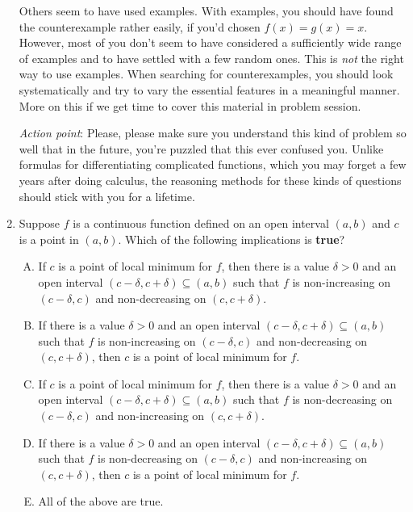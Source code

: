\documentclass[10pt]{amsart}
\begin{document}
\begin{enumerate}
  Others seem to have used examples. With examples, you should have
  found the counterexample rather easily, if you'd chosen $f(x) = g(x)
  = x$. However, most of you don't seem to have considered a
  sufficiently wide range of examples and to have settled with a few
  random ones. This is {\em not} the right way to use examples. When
  searching for counterexamples, you should look systematically and
  try to vary the essential features in a meaningful manner. More on
  this if we get time to cover this material in problem session.

  {\em Action point}: Please, please make sure you understand this
  kind of problem so well that in the future, you're puzzled that this
  ever confused you. Unlike formulas for differentiating complicated
  functions, which you may forget a few years after doing calculus,
  the reasoning methods for these kinds of questions should stick with
  you for a lifetime.

\item Suppose $f$ is a continuous function defined on an open interval
  $(a,b)$ and $c$ is a point in $(a,b)$. Which of the following
  implications is {\bf true}?
  \begin{enumerate}[(A)]

  \item If $c$ is a point of local minimum for $f$, then there is a
    value $\delta > 0$ and an open interval $(c - \delta, c + \delta)
    \subseteq (a,b)$ such that $f$ is non-increasing on $(c -
    \delta,c)$ and non-decreasing on $(c,c+\delta)$.
  \item If there is a value $\delta > 0$ and an open interval $(c -
    \delta, c + \delta) \subseteq (a,b)$ such that $f$ is
    non-increasing on $(c - \delta,c)$ and non-decreasing on
    $(c,c+\delta)$, then $c$ is a point of local minimum for $f$.
  \item If $c$ is a point of local minimum for $f$, then there is a
    value $\delta > 0$ and an open interval $(c - \delta, c + \delta)
    \subseteq (a,b)$ such that $f$ is non-decreasing on $(c -
    \delta,c)$ and non-increasing on $(c,c+\delta)$.
  \item If there is a value $\delta > 0$ and an open interval $(c -
    \delta, c + \delta) \subseteq (a,b)$ such that $f$ is
    non-decreasing on $(c - \delta,c)$ and non-increasing on
    $(c,c+\delta)$, then $c$ is a point of local minimum for $f$.
  \item All of the above are true.
  \end{enumerate}


\end{enumerate}
\end{document}
